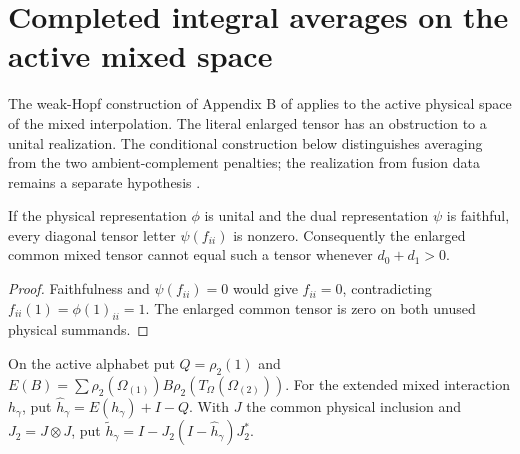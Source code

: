 \section{Completed integral averages on the active mixed space}
\label{sec:mpo_mixed_wha_parent}

The weak-Hopf construction of Appendix B of
\cite{GarreRubio2023MPOSym} applies to the active physical space of the
mixed interpolation. The literal enlarged tensor has an obstruction to a
unital realization. The conditional construction below distinguishes
averaging from the two ambient-complement penalties; the realization
from fusion data remains a separate hypothesis
\cite{gap:glm23_mixed_weak_hopf_realization}.

\begin{lemma}
    \label{lem:mpo_mixed_wha_obstruction}
    \leanok
    If the physical representation $\phi$ is unital and the dual
    representation $\psi$ is faithful, every diagonal tensor letter
    $\psi(f_{ii})$ is nonzero. Consequently the enlarged common mixed
    tensor cannot equal such a tensor whenever $d_0+d_1>0$.
\end{lemma}
\begin{proof}
    \leanok
    Faithfulness and $\psi(f_{ii})=0$ would give $f_{ii}=0$, contradicting
    $f_{ii}(1)=\phi(1)_{ii}=1$. The enlarged common tensor is zero on
    both unused physical summands.
\end{proof}

\begin{definition}
    \label{def:mpo_mixed_wha_completion}
    \leanok
    On the active alphabet put $Q=\rho_2(1)$ and
    $E(B)=\sum\rho_2(\Omega_{(1)})B\rho_2(T_\Omega(\Omega_{(2)}))$.
    For the extended mixed interaction $h_\gamma$, put
    $\widehat h_\gamma=E(h_\gamma)+I-Q$.
    With $J$ the common physical inclusion and $J_2=J\otimes J$, put
    $\widetilde h_\gamma=I-J_2(I-\widehat h_\gamma)J_2^*$.
\end{definition}

